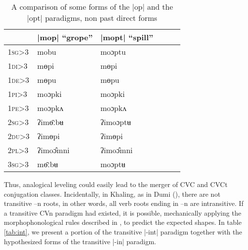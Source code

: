 \documentclass[oldfontcommands,oneside,a4paper,11pt]{article}
\newcommand{\ipa}[1]{{\phon #1}} %
\newcommand{\grise}[1]{\cellcolor{lightgray}\textbf{#1}}
\begin{document}
\begin{table}[h]
\caption{A comparison of some forms of the |op| and the |opt| paradigms, non past direct forms} \label{tab:opt} \centering
\begin{tabular}{llllll}
\toprule
\textsc{} &	|mop| ``grope''  &  	|mopt| ``spill''  \\  	
\midrule
\textsc{1sg>3} &	\ipa{mobu}&  \grise{}  	\ipa{moɔptu}  \\  	
\textsc{1di>3} &	\ipa{mɵpi}  &  	\ipa{mɵpi}  \\  	
\textsc{1de>3} &	\ipa{mɵpu}  &  	\ipa{mɵpu}  \\  	
\textsc{1pi>3} &	\ipa{moɔpki}  &  	\ipa{moɔpki}  \\  	
\textsc{1pe>3} &	\ipa{moɔpkʌ}  &  	\ipa{moɔpkʌ}  \\  	
\textsc{2sg>3} &	\ipa{ʔimɵ̄ːbʉ}  &   \grise{} 	\ipa{ʔimoɔptʉ}  \\  	
\textsc{2du>3} &	\ipa{ʔimɵpi}  &  	\ipa{ʔimɵpi}  \\  	
\textsc{2pl>3} &	\ipa{ʔimoɔ̂mni}  &  	\ipa{ʔimoɔ̂mni}  \\  	
\textsc{3sg>3} &	\ipa{mɵ̄ːbʉ}  &  \grise{}  	\ipa{moɔptʉ}  \\  	
\bottomrule
\end{tabular}
\end{table}

Thus, analogical leveling could easily lead to the merger of CVC and CVCt conjugation classes. Incidentally, in Khaling, as in Dumi (\citealt{driem93dumi}), there are not transitive \ipa{--n} roots, in other words, all verb roots ending in \ipa{--n} are intransitive.  If a transitive CVn paradigm had existed, it is possible, mechanically applying the morphophonological rules described in \citet{jacques12khaling}, to predict the expected shapes. In table \ref{tab:int}, we present a portion of the transitive |-int| paradigm together with the hypothesized forms of the transitive |-in| paradigm.
\end{document}
